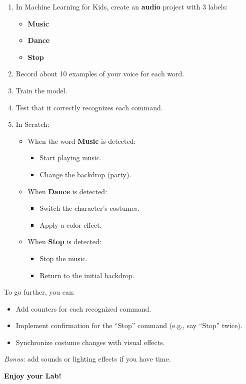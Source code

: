 \documentclass[12pt,a4paper]{article}
\newcommand{\tick}{\textcolor{green!50!black}{\checkmark}\ }
\begin{document}
\begin{enumerate}[label=\textbf{\arabic*.}, leftmargin=2em, itemsep=6pt]
    \item In Machine Learning for Kids, create an \textbf{audio} project with 3 labels:
    \begin{itemize}[leftmargin=*, label=\tick]
        \item \textbf{Music}
        \item \textbf{Dance}
        \item \textbf{Stop}
    \end{itemize}
    \item Record about 10 examples of your voice for each word.
    \item Train the model.
    \item Test that it correctly recognizes each command.
    \item In Scratch:
    \begin{itemize}[leftmargin=*, label=\tick]
        \item When the word \textbf{Music} is detected:
        \begin{itemize}[leftmargin=*, label=--]
            \item Start playing music.
            \item Change the backdrop (party).
        \end{itemize}
        \item When \textbf{Dance} is detected:
        \begin{itemize}[leftmargin=*, label=--]
            \item Switch the character’s costumes.
            \item Apply a color effect.
        \end{itemize}
        \item When \textbf{Stop} is detected:
        \begin{itemize}[leftmargin=*, label=--]
            \item Stop the music.
            \item Return to the initial backdrop.
        \end{itemize}
    \end{itemize}
\end{enumerate}

\begin{conseilbox}
To go further, you can:  
\begin{itemize}[leftmargin=*, label=\tick]
    \item Add counters for each recognized command.  
    \item Implement confirmation for the “Stop” command (e.g., say “Stop” twice).  
    \item Synchronize costume changes with visual effects.  
\end{itemize}

\textit{Bonus:} add sounds or lighting effects if you have time.
\end{conseilbox}

\vfill
\begin{center}
    \textbf{Enjoy your Lab!}
\end{center}
\end{document}
